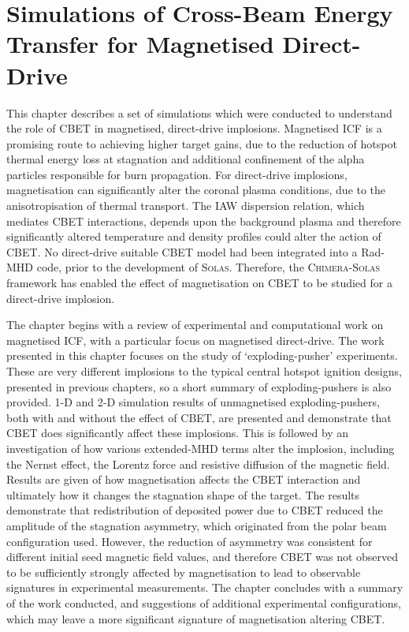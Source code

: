 \chapter{Simulations of Cross-Beam Energy Transfer for Magnetised Direct-Drive}%
\label{chap:Mag}

This chapter describes a set of simulations which were conducted to understand the role of \ac{CBET} in magnetised, direct-drive implosions.
Magnetised \ac{ICF} is a promising route to achieving higher target gains, due to the reduction of hotspot thermal energy loss at stagnation and additional confinement of the alpha particles responsible for burn propagation.
For direct-drive implosions, magnetisation can significantly alter the coronal plasma conditions, due to the anisotropisation of thermal transport.
The \ac{IAW} dispersion relation, which mediates \ac{CBET} interactions, depends upon the background plasma and therefore significantly altered temperature and density profiles could alter the action of \ac{CBET}.
No direct-drive suitable \ac{CBET} model had been integrated into a \ac{Rad-MHD} code, prior to the development of \textsc{Solas}.
Therefore, the \textsc{Chimera}-\textsc{Solas} framework has enabled the effect of magnetisation on \ac{CBET} to be studied for a direct-drive implosion.

The chapter begins with a review of experimental and computational work on magnetised \ac{ICF}, with a particular focus on magnetised direct-drive.
The work presented in this chapter focuses on the study of `exploding-pusher' experiments.
These are very different implosions to the typical central hotspot ignition designs, presented in previous chapters, so a short summary of exploding-pushers is also provided.
1-D and 2-D simulation results of unmagnetised exploding-pushers, both with and without the effect of \ac{CBET}, are presented and demonstrate that \ac{CBET} does significantly affect these implosions.
This is followed by an investigation of how various extended-\ac{MHD} terms alter the implosion, including the Nernst effect, the Lorentz force and resistive diffusion of the magnetic field.
Results are given of how magnetisation affects the \ac{CBET} interaction and ultimately how it changes the stagnation shape of the target.
The results demonstrate that redistribution of deposited power due to \ac{CBET} reduced the amplitude of the stagnation asymmetry, which originated from the polar beam configuration used.
However, the reduction of asymmetry was consistent for different initial seed magnetic field values, and therefore \ac{CBET} was not observed to be sufficiently strongly affected by magnetisation to lead to observable signatures in experimental measurements.
The chapter concludes with a summary of the work conducted, and suggestions of additional experimental configurations, which may leave a more significant signature of magnetisation altering \ac{CBET}.

